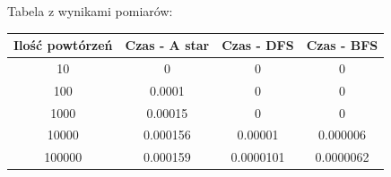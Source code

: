 \documentclass[a4paper,11pt]{report}
\begin{document}
\begin{figure}
  \begin{center}
  Tabela z wynikami pomiarów:\\
  \begin{tabular}{|c|c|c|c|}
  \hline 
  Ilość powtórzeń & Czas - A star & Czas - DFS & Czas - BFS\\
  \hline
  10 & 0 & 0 & 0\\
  \hline
  100 & 0.0001 & 0 & 0\\
  \hline
  1000	&	0.00015 & 0 & 0\\
  \hline
  10000	&	0.000156 & 0.00001 & 0.000006\\
  \hline
  100000 &	0.000159 & 0.0000101 & 0.0000062\\
  \hline
\end{tabular}
\end{center}
\end{figure}
\end{document}
